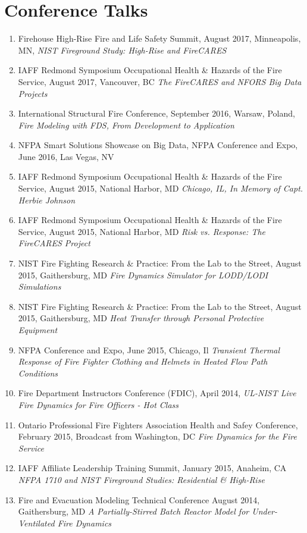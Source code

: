 \documentclass[10pt,letterpaper]{article}
\begin{document}
\section*{Conference Talks}
\begin{enumerate}
\item Firehouse High-Rise Fire and Life Safety Summit, August 2017, Minneapolis, MN, {\em NIST Fireground Study: High-Rise and FireCARES}
\item IAFF Redmond Symposium Occupational Health \& Hazards of the Fire Service, August 2017, Vancouver, BC {\em The FireCARES and NFORS Big Data Projects}
\item International Structural Fire Conference, September 2016, Warsaw, Poland, {\em Fire Modeling with FDS, From Development to Application}
\item NFPA Smart Solutions Showcase on Big Data, NFPA Conference and Expo, June 2016, Las Vegas, NV
\item IAFF Redmond Symposium Occupational Health \& Hazards of the Fire Service, August 2015, National Harbor, MD {\em Chicago, IL, In Memory of Capt. Herbie Johnson}
\item IAFF Redmond Symposium Occupational Health \& Hazards of the Fire Service, August 2015, National Harbor, MD {\em Risk vs. Response: The FireCARES Project}
\item NIST Fire Fighting Research \& Practice: From the Lab to the Street, August 2015, Gaithersburg, MD {\em Fire Dynamics Simulator for LODD/LODI Simulations}
\item NIST Fire Fighting Research \& Practice: From the Lab to the Street, August 2015, Gaithersburg, MD {\em Heat Transfer through Personal Protective Equipment}
\item NFPA Conference and Expo, June 2015, Chicago, Il {\em Transient Thermal Response of Fire Fighter Clothing and Helmets in Heated Flow Path Conditions}
\item Fire Department Instructors Conference (FDIC), April 2014, {\em UL-NIST Live Fire Dynamics for Fire Officers - Hot Class}
\item Ontario Professional Fire Fighters Association Health and Safey Conference, February 2015, Broadcast from Washington, DC {\em Fire Dynamics for the Fire Service}
\item IAFF Affiliate Leadership Training Summit, January 2015, Anaheim, CA {\em NFPA 1710 and NIST Fireground Studies: Residential \& High-Rise}
\item Fire and Evacuation Modeling Technical Conference August 2014, Gaithersburg, MD {\em A Partially-Stirred Batch Reactor Model for Under-Ventilated Fire Dynamics}

\end{enumerate}
\end{document}

